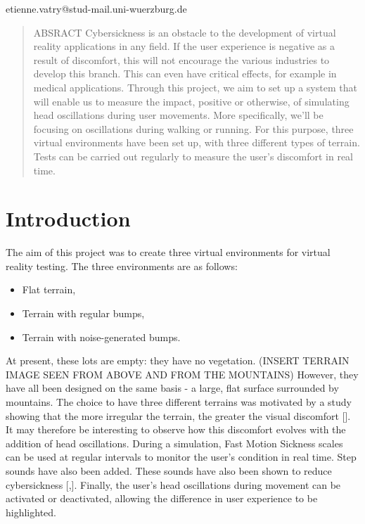 \documentclass[american]{acmtog} %
\begin{document}

\maketitle

\begin{bottomstuff}
etienne.vatry@stud-mail.uni-wuerzburg.de
\end{bottomstuff}

\begin{abstract}
ABSRACT Cybersickness is an obstacle to the development of virtual reality applications in any field. If the user experience is negative as a result of discomfort, this will not encourage the various industries to develop this branch. This can even have critical effects, for example in medical applications. Through this project, we aim to set up a system that will enable us to measure the impact, positive or otherwise, of simulating head oscillations during user movements. More specifically, we'll be focusing on oscillations during walking or running. For this purpose, three virtual environments have been set up, with three different types of terrain. Tests can be carried out regularly to measure the user's discomfort in real time.
\end{abstract}


\section{Introduction}
\label{sec:introduction}
The aim of this project was to create three virtual environments for virtual reality testing. The three environments are as follows:
\begin{itemize}[label=\textbullet]
    \item Flat terrain,
    \item Terrain with regular bumps,
    \item Terrain with noise-generated bumps.
\end{itemize}
At present, these lots are empty: they have no vegetation. (INSERT TERRAIN IMAGE SEEN FROM ABOVE AND FROM THE MOUNTAINS) However, they have all been designed on the same basis - a large, flat surface surrounded by mountains. The choice to have three different terrains was motivated by a study showing that the more irregular the terrain, the greater the visual discomfort [\cite{bumpy_ride}]. It may therefore be interesting to observe how this discomfort evolves with the addition of head oscillations. During a simulation, Fast Motion Sickness scales can be used at regular intervals to monitor the user's condition in real time. Step sounds have also been added. These sounds have also been shown to reduce cybersickness [\cite{audio_in_vr},\cite{walking_vibe}]. Finally, the user's head oscillations during movement can be activated or deactivated, allowing the difference in user experience to be highlighted.
\end{document}
